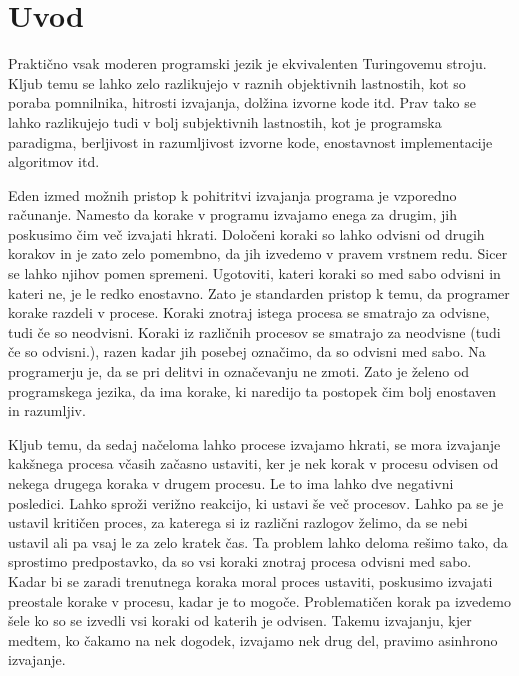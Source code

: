 \section{Uvod} \label{sec:uvod}


Praktično vsak moderen programski jezik je ekvivalenten Turingovemu stroju. Kljub temu se lahko zelo razlikujejo v raznih objektivnih lastnostih, kot so poraba pomnilnika, hitrosti izvajanja, dolžina izvorne kode itd. Prav tako se lahko razlikujejo tudi v bolj subjektivnih lastnostih, kot je programska paradigma, berljivost in razumljivost izvorne kode, enostavnost implementacije algoritmov itd.

Eden izmed možnih pristop k pohitritvi izvajanja programa je vzporedno računanje. Namesto da korake v programu izvajamo enega za drugim, jih poskusimo čim več izvajati hkrati. Določeni koraki so lahko odvisni od drugih korakov in je zato zelo pomembno, da jih izvedemo v pravem vrstnem redu. Sicer se lahko njihov pomen spremeni. Ugotoviti, kateri koraki so med sabo odvisni in kateri ne, je le redko enostavno. Zato je standarden pristop k temu, da programer korake razdeli v procese. Koraki znotraj istega procesa se smatrajo za odvisne, tudi če so neodvisni. Koraki iz različnih procesov se smatrajo za neodvisne (tudi če so odvisni.), razen kadar jih posebej označimo, da so odvisni med sabo.
Na programerju je, da se pri delitvi in označevanju ne zmoti. Zato je želeno od programskega jezika, da ima korake, ki naredijo ta postopek čim bolj enostaven in razumljiv.

Kljub temu, da sedaj načeloma lahko procese izvajamo hkrati, se mora izvajanje kakšnega procesa včasih začasno ustaviti, ker je nek korak v procesu odvisen od nekega drugega koraka v drugem procesu. Le to ima lahko dve negativni posledici. Lahko sproži verižno reakcijo, ki ustavi še več procesov. Lahko pa se je ustavil kritičen proces, za katerega si iz različni razlogov želimo, da se nebi ustavil ali pa vsaj le za zelo kratek čas.
Ta problem lahko deloma rešimo tako, da sprostimo predpostavko, da so vsi koraki znotraj procesa odvisni med sabo. Kadar bi se zaradi trenutnega koraka moral proces ustaviti, poskusimo izvajati preostale korake v procesu, kadar je to mogoče. Problematičen korak pa izvedemo šele ko so se izvedli vsi koraki od katerih je odvisen. Takemu izvajanju, kjer medtem, ko čakamo na nek dogodek, izvajamo nek drug del, pravimo asinhrono izvajanje. 



